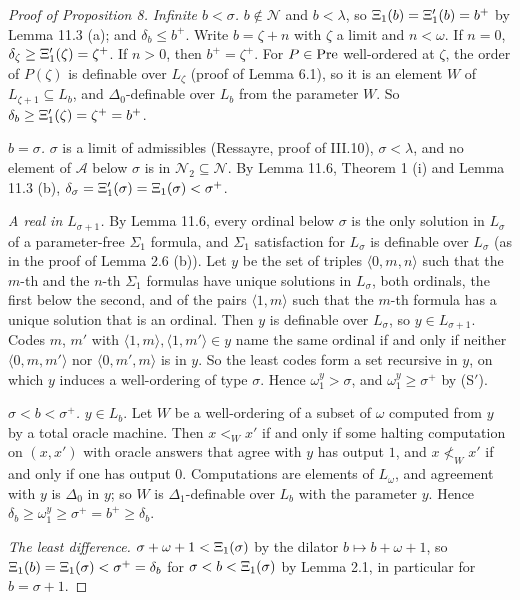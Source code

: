 \documentclass[11pt]{article}
\begin{document}
\begin{proof}[Proof of Proposition 8] \emph{Infinite $b < \sigma$.} $b \notin \mathcal N$ and $b < \lambda$, so
$\Xi_1(b) = \Xi'_1(b) = b^+$ by Lemma 11.3 (a); and $\delta_b \le b^+$. Write $b = \zeta + n$ with $\zeta$ a limit
and $n < \omega$. If $n = 0$, $\delta_{\zeta} \ge \Xi'_1(\zeta) = \zeta^+$. If $n > 0$, then $b^+ = \zeta^+$.
For $P \in \mathrm{Pre}$ well-ordered at $\zeta$, the order of $P(\zeta)$ is definable over $L_{\zeta}$ (proof of
Lemma 6.1), so it is an element $W$ of $L_{\zeta + 1} \subseteq L_b$, and $\Delta_0$-definable over $L_b$ from the
parameter $W$. So $\delta_b \ge \Xi'_1(\zeta) = \zeta^+ = b^+$.

\emph{$b = \sigma$.} $\sigma$ is a limit of admissibles (Ressayre, proof of III.10), $\sigma < \lambda$, and no element
of $\mathcal A$ below $\sigma$ is in $\mathcal N_2 \subseteq \mathcal N$. By Lemma 11.6, Theorem 1 (i) and Lemma
11.3 (b), $\delta_{\sigma} = \Xi'_1(\sigma) = \Xi_1(\sigma) < \sigma^+$.

\emph{A real in $L_{\sigma + 1}$.} By Lemma 11.6, every ordinal below $\sigma$ is the only solution in $L_{\sigma}$
of a parameter-free $\Sigma_1$ formula, and $\Sigma_1$ satisfaction for $L_{\sigma}$ is definable over $L_{\sigma}$
(as in the proof of Lemma 2.6 (b)). Let $y$ be the set of triples $\langle 0, m, n\rangle$ such that the $m$-th and
the $n$-th $\Sigma_1$ formulas have unique solutions in $L_{\sigma}$, both ordinals, the first below the second,
and of the pairs $\langle 1, m\rangle$ such that the $m$-th formula has a unique solution that is an ordinal. Then
$y$ is definable over $L_{\sigma}$, so $y \in L_{\sigma + 1}$. Codes $m$, $m'$ with $\langle 1, m\rangle,
\langle 1, m'\rangle \in y$ name the same ordinal if and only if neither $\langle 0, m, m'\rangle$ nor
$\langle 0, m', m\rangle$ is in $y$. So the least codes form a set recursive in $y$, on which $y$ induces a
well-ordering of type $\sigma$. Hence $\omega_1^y > \sigma$, and $\omega_1^y \ge \sigma^+$ by (S$'$).

\emph{$\sigma < b < \sigma^+$.} $y \in L_b$. Let $W$ be a well-ordering of a subset of $\omega$ computed from
$y$ by a total oracle machine. Then $x <_W x'$ if and only if some halting computation on $(x, x')$ with oracle
answers that agree with $y$ has output $1$, and $x \not<_W x'$ if and only if one has output $0$. Computations are
elements of $L_{\omega}$, and agreement with $y$ is $\Delta_0$ in $y$; so $W$ is $\Delta_1$-definable over $L_b$
with the parameter $y$. Hence $\delta_b \ge \omega_1^y \ge \sigma^+ = b^+ \ge \delta_b$.

\emph{The least difference.} $\sigma + \omega + 1 < \Xi_1(\sigma)$ by the dilator $b \mapsto b + \omega + 1$, so
$\Xi_1(b) = \Xi_1(\sigma) < \sigma^+ = \delta_b$ for $\sigma < b < \Xi_1(\sigma)$ by Lemma 2.1, in particular for
$b = \sigma + 1$.
\end{proof}
\end{document}

